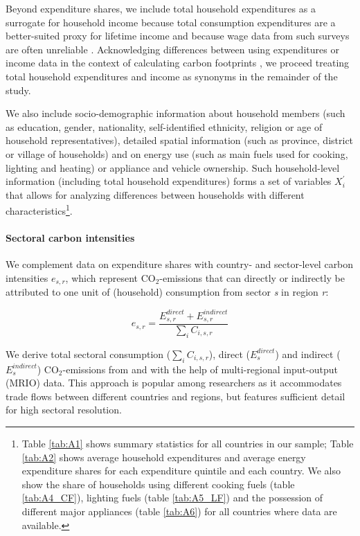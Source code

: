 \documentclass[12pt, a4paper]{article}
\begin{document}
Beyond expenditure shares, we include total household expenditures as a surrogate for household income because total consumption expenditures are a better-suited proxy for lifetime income \autocite{Poterba.1989,Poterba.1991,Cronin.2019} and because wage data from such surveys are often unreliable \autocite{Blundell.1998}. Acknowledging differences between using expenditures or income data in the context of calculating carbon footprints \autocite{Levay.2023}, we proceed treating total household expenditures and income as synonyms in the remainder of the study.

We also include socio-demographic information about household members (such as education, gender, nationality, self-identified ethnicity, religion or age of household representatives), detailed spatial information (such as province, district or village of households) and on energy use (such as main fuels used for cooking, lighting and heating) or appliance and vehicle ownership. Such household-level information (including total household expenditures) forms a set of variables $X_{i}^{'}$ that allows for analyzing differences between households with different characteristics\footnote{Table \ref{tab:A1} shows summary statistics for all countries in our sample; Table \ref{tab:A2} shows average household expenditures and average energy expenditure shares for each expenditure quintile and each country. We also show the share of households using different cooking fuels (table \ref{tab:A4_CF}), lighting fuels (table \ref{tab:A5_LF}) and the possession of different major appliances (table \ref{tab:A6}) for all countries where data are available.}.

\paragraph{Sectoral carbon intensities} We complement data on expenditure shares with country- and sector-level carbon intensities $e_{s,r}$, which represent CO$_{2}$-emissions that can directly or indirectly be attributed to one unit of (household) consumption from sector \textit{s} in region \textit{r}:

\begin{equation}
    e_{s,r} = \frac{E_{s,r}^{direct}+E_{s,r}^{indirect}}{\sum_{i} C_{i,s,r}}
\end{equation}

We derive total sectoral consumption ($\sum_{i} C_{i,s,r}$), direct ($E_{s}^{direct}$) and indirect ($E_{s}^{indirect}$) CO$_{2}$-emissions from and with the help of multi-regional input-output (MRIO) data. This approach is popular among researchers as it accommodates trade flows between different countries and regions, but features sufficient detail for high sectoral resolution. 
\end{document}
